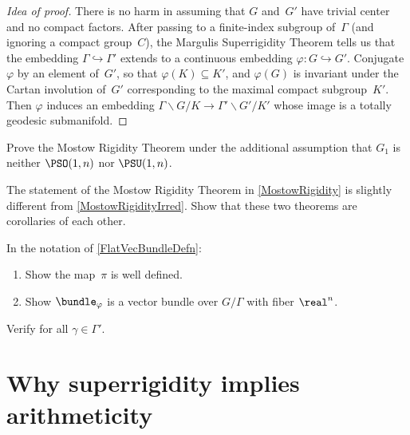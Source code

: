 \begin{proof}[Idea of proof]
There is no harm in assuming that $G$ and~$G'$ have trivial center and no compact factors.
After passing to a finite-index subgroup of~$\Gamma$ 
	(and ignoring a compact group~$C$),
the Margulis Superrigidity Theorem tells us that the embedding $\Gamma \hookrightarrow \Gamma'$ extends to a continuous embedding $\varphi \colon G \hookrightarrow G'$. Conjugate $\varphi$ by an element of~$G'$, so that $\varphi(K) \subseteq K'$, and $\varphi(G)$ is invariant under the Cartan involution of~$G'$ corresponding to the maximal compact subgroup~$K'$. Then $\varphi$ induces an embedding $\Gamma \backslash G / K \to \Gamma ' \backslash G' \! / K'$ whose image is a totally geodesic submanifold.
\end{proof}


\begin{exercises}

\item \label{ProveMostMostowEx}
Prove the Mostow Rigidity Theorem  under the additional assumption that $G_1$ is neither $\PSO(1,n)$ nor $\PSU(1,n)$.

\item The statement of the Mostow Rigidity Theorem in \cref{MostowRigidity} is slightly different from \cref{MostowRigidityIrred}. Show that these two theorems are corollaries of each other.

\item \label{FlatVecBundleDefnEx}
In the notation of \cref{FlatVecBundleDefn}:
\noprelistbreak
	\begin{enumerate}
	\item Show the map~$\pi$ is well defined.
	\item Show $\bundle_\varphi$ is a vector bundle over $G/\Gamma$ with fiber $\real^n$.
	\end{enumerate}

\item \label{FlatBundleTequiEx}
Verify  for all $\gamma \in \Gamma'$.

\end{exercises}






\section{Why superrigidity implies arithmeticity}
 \label{MargArithPf}

